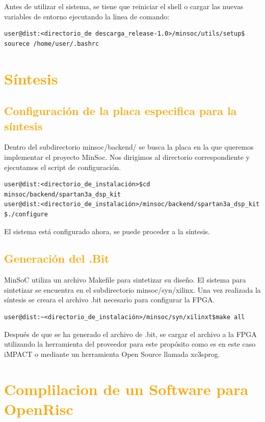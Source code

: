 \documentclass[a4paper,11pt]{article}
\begin{document}
Antes de utilizar el sistema, se tiene que reiniciar el shell o cargar las nuevas variables de entorno ejecutando la linea de comando:

\begin{verbatim}
user@dist:<directorio_de descarga_release-1.0>/minsoc/utils/setup$ sourece /home/user/.bashrc
\end{verbatim}

\section{\textcolor{orange}{Síntesis}}

\subsection{\textcolor{orange}{Configuración de la placa especifica para la síntesis}}
Dentro del subdirectorio minsoc/backend/ se busca la placa en la que queremos implementar el proyecto MinSoc. Nos dirigimos al directorio correspondiente y ejecutamos el script de configuración.

\begin{verbatim}
user@dist:<directorio_de_instalación>$cd minsoc/backend/spartan3a_dsp_kit 
user@dist:<directorio_de_instalación>/minsoc/backend/spartan3a_dsp_kit $./configure 
\end{verbatim}

El sistema está configurado ahora, se puede proceder a la síntesis.

\subsection{\textcolor{orange}{Generación del .Bit}}

MinSoC utiliza un archivo Makefile para sintetizar su diseño. El sistema para sintetizar se encuentra en el subdirectorio minsoc/syn/xilinx. Una vez realizada la síntesis se creara el archivo .bit necesario para configurar la FPGA.

\begin{verbatim}
user@dist:~<directorio_de_instalación>/minsoc/syn/xilinxt$make all
\end{verbatim}

Después de que se ha generado el archivo de .bit, se cargar el archivo a la FPGA utilizando la herramienta del proveedor para este propósito como es en este caso iMPACT o mediante un herramienta Open Source llamada xc3sprog. 

\section{\textcolor{orange}{Complilacion de un Software para OpenRisc}}
\end{document}
